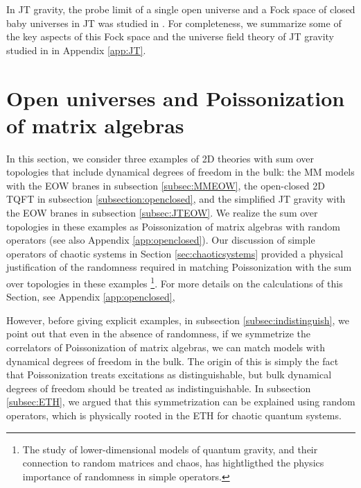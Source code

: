 \documentclass[a4paper,11pt]{article}
\theoremstyle{definition}
\numberwithin{equation}{section}
\begin{document}
In JT gravity, the probe limit of a single open universe and a Fock space of closed baby universes in JT was studied in \cite{penington2023algebras}. For completeness, we summarize some of the key aspects of this Fock space and the universe field theory of JT gravity studied in \cite{post2022universe} in Appendix \ref{app:JT}.


\section{Open universes and Poissonization of matrix algebras}\label{sec:babyuniversesnonAbel}



In this section, we consider three examples of 2D theories with sum over topologies that include dynamical degrees of freedom in the bulk: the MM models with the EOW branes in subsection \ref{subsec:MMEOW}, the open-closed 2D TQFT in subsection \ref{subsection:openclosed}, and the simplified JT gravity with the EOW branes in subsection \ref{subsec:JTEOW}. We realize the sum over topologies in these examples as Poissonization of matrix algebras with random operators (see also Appendix \ref{app:openclosed}). Our discussion of simple operators of chaotic systems in Section \ref{sec:chaoticsystems} provided a physical justification of the randomness required in matching Poissonization with the sum over topologies in these examples \footnote{The study of lower-dimensional models of quantum gravity, and their connection to random matrices and chaos, has hightligthed the physics importance of randomness in simple operators.}. For more details on the calculations of this Section, see Appendix \ref{app:openclosed},

However, before giving explicit examples, in subsection \ref{subsec:indistinguish}, we point out that even in the absence of randomness, if we symmetrize the correlators of Poissonization of matrix algebras, we can match models with dynamical degrees of freedom in the bulk. The origin of this is simply the fact that Poissonization treats excitations as distinguishable, but bulk dynamical degrees of freedom should be treated as indistinguishable.
In subsection \ref{subsec:ETH}, we argued that this symmetrization can be explained using random operators, which is physically rooted in the ETH for chaotic quantum systems. 
 
\end{document}
